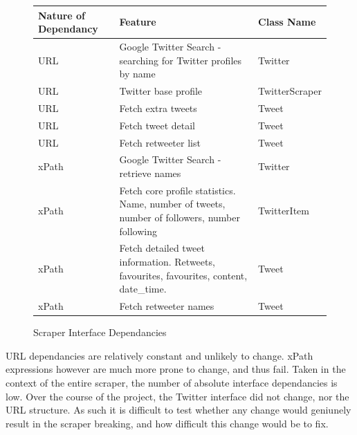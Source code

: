 \begin{figure}[h!]
\begin{center}
  \begin{tabular}{| l | p{6cm} | l |}
  \hline
   \textbf{Nature of Dependancy} & \textbf{Feature} & \textbf{Class Name} \\ \hline
   URL & Google Twitter Search - searching for Twitter profiles by name & Twitter \\ \hline
   URL & Twitter base profile & TwitterScraper \\ \hline
   URL & Fetch extra tweets & Tweet \\ \hline
   URL & Fetch tweet detail & Tweet \\ \hline
   URL & Fetch retweeter list & Tweet \\ \hline
   xPath & Google Twitter Search - retrieve names & Twitter \\ \hline
   xPath & Fetch core profile statistics. Name, number of tweets, number of followers, number following & TwitterItem \\ \hline
   xPath & Fetch detailed tweet information. Retweets, favourites, favourites, content, date\_time. & Tweet \\ \hline
   xPath & Fetch retweeter names & Tweet \\ \hline
  \end{tabular}  
\end{center}
\caption{Scraper Interface Dependancies}
\end{figure}

URL dependancies are relatively constant and unlikely to change. xPath expressions however are much more prone to change, and thus fail. Taken in the context of the entire scraper, the number of absolute interface dependancies is low. Over the course of the project, the Twitter interface did not change, nor the URL structure. As such it is difficult to test whether any change would geniunely result in the scraper breaking, and how difficult this change would be to fix. %







